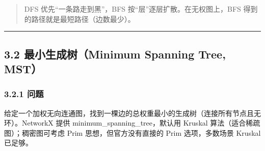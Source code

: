 \begin{Shaded}
\begin{Highlighting}[]
\end{Highlighting}
\end{Shaded}

\begin{quote}
DFS 优先``一条路走到黑''，BFS 按``层''逐层扩散。在无权图上，BFS
得到的路径就是最短路径（边数最少）。
\end{quote}

\begin{center}\rule{0.5\linewidth}{0.5pt}\end{center}

\subsection{3.2 最小生成树（Minimum Spanning Tree,
MST）}\label{ux6700ux5c0fux751fux6210ux6811minimum-spanning-tree-mst}

\subsubsection{3.2.1 问题}\label{ux95eeux9898}

给定一个加权无向连通图，找到一棵边的总权重最小的生成树（连接所有节点且无环）。NetworkX
提供 minimum\_spanning\_tree，默认用 Kruskal
算法（适合稀疏图）；稠密图可考虑 Prim 思想，但官方没有直接的 Prim
选项，多数场景 Kruskal 已足够。

